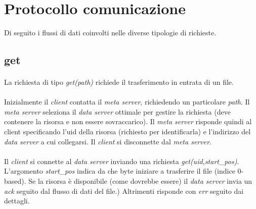 \documentclass{article}
\begin{document}
\section{Protocollo comunicazione}

Di seguito i flussi di dati coinvolti nelle diverse tipologie di richieste.

\subsection{get}

\paragraph{} La richiesta di tipo \emph{get(path)} richiede il trasferimento in entrata di un file. 

\paragraph{} Inizialmente il \emph{client} contatta il \emph{meta server}, richiedendo un particolare \emph{path}. Il \emph{meta server} seleziona il \emph{data server} ottimale per gestire la richiesta (deve contenere la risorsa e non essere sovraccarico). Il \emph{meta server} risponde quindi al client specificando l'uid della risorsa (richiesto per identificarla) e l'indirizzo del \emph{data server} a cui collegarsi. Il \emph{client} si disconnette dal \emph{meta server}.

\paragraph{} Il \emph{client} si connette al \emph{data server} inviando una richiesta \emph{get(uid,start\_pos)}. L'argomento \emph{start\_pos} indica da che byte iniziare a trasferire il file (indice 0-based). Se la risorsa è disponibile (come dovrebbe essere) il \emph{data server} invia un \emph{ack} seguito dal flusso di dati del file.) Altrimenti risponde con \emph{err} seguito dai dettagli. 
\end{document}
